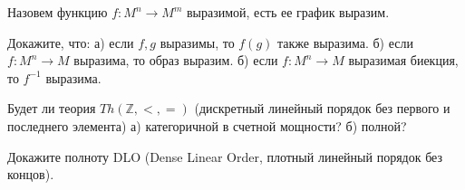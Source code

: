 \breakline

Назовем функцию $f:M^{n} \to M^{m}$ выразимой, есть ее график выразим.

\begin{ptask}{3}
	Докажите, что:
    а) если $f, g$ выразимы, то $f(g)$ также выразима.
    б) если $f:M^{n} \to M$ выразима, то образ выразим.
    б) если $f:M^{n} \to M$ выразимая биекция, то $f^{-1}$ выразима.
\end{ptask}

\begin{ptask}{4}
    Будет ли теория $Th(\mathbb{Z}, <, =)$ (дискретный линейный порядок
    без первого и последнего элемента)
    а) категоричной в счетной мощности?
    б) полной?
\end{ptask}

\begin{ptask}{5}
    Докажите полноту DLO (Dense Linear Order, плотный линейный порядок без концов).
\end{ptask}
